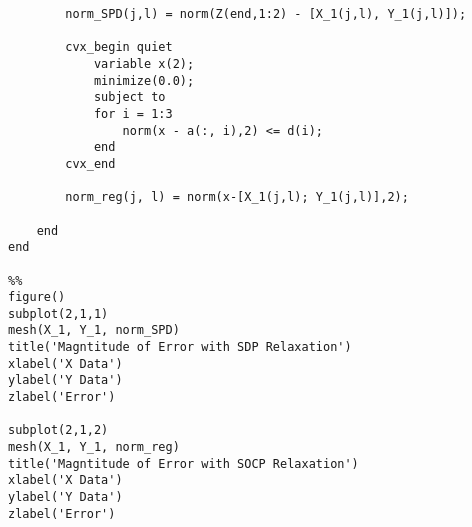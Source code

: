 \documentclass[12pt,letterpaper]{article}
\begin{document}
\begin{lstlisting}
        norm_SPD(j,l) = norm(Z(end,1:2) - [X_1(j,l), Y_1(j,l)]);
        
        cvx_begin quiet
            variable x(2);
            minimize(0.0);
            subject to
            for i = 1:3
                norm(x - a(:, i),2) <= d(i);
            end
        cvx_end
        
        norm_reg(j, l) = norm(x-[X_1(j,l); Y_1(j,l)],2);
              
    end
end

%%
figure()
subplot(2,1,1)
mesh(X_1, Y_1, norm_SPD)
title('Magntitude of Error with SDP Relaxation')
xlabel('X Data')
ylabel('Y Data')
zlabel('Error')

subplot(2,1,2)
mesh(X_1, Y_1, norm_reg)
title('Magntitude of Error with SOCP Relaxation')
xlabel('X Data')
ylabel('Y Data')
zlabel('Error')
\end{lstlisting}
\end{document}

